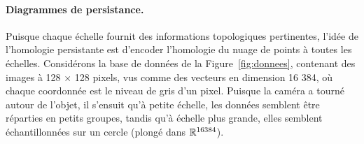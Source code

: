 \paragraph*{Diagrammes de persistance.} Puisque chaque \'echelle fournit des informations topologiques pertinentes,
l'id\'ee de l'homologie persistante est d'encoder l'homologie du nuage de points \`a toutes les \'echelles. Consid\'erons
la base de donn\'ees de la Figure~\ref{fig:donnees}, contenant des images \`a 128 $\times$ 128 pixels, vus comme
des vecteurs en dimension 16 384, o\`u chaque coordonn\'ee est le niveau de gris d'un pixel.
Puisque la cam\'era a tourn\'e autour de l'objet,
il s'ensuit qu'\`a petite \'echelle, les donn\'ees
semblent \^etre r\'eparties en petits groupes, tandis qu'\`a \'echelle plus grande, elles semblent \'echantillonn\'ees sur un cercle
(plong\'e dans $\mathbb{R}^{16384}$).


